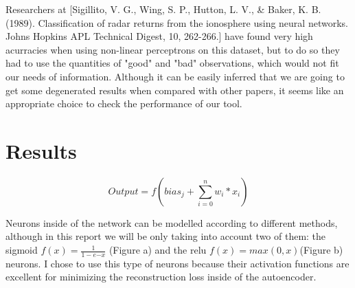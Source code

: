 \documentclass[12pt]{report}
\begin{document}
Researchers at [Sigillito, V. G., Wing, S. P., Hutton, L. V., \& Baker, K. B. (1989). Classification of radar returns from the ionosphere using neural networks. Johns Hopkins APL Technical Digest, 10, 262-266.] have found very high acurracies when using non-linear perceptrons on this dataset, but to do so they had to use the quantities of "good" and "bad" observations, which would not fit our needs of information. Although it can be easily inferred that we are going to get some degenerated results when compared with other papers, it seems like an appropriate choice to check the performance of our tool. \par 

\chapter{Results}


\begin{equation}
\label{eq:artificial neuron}
Output = f( bias_j + \sum_{i = 0}^{n} w_{i}*x_i ) 
\end{equation}
\newline

Neurons inside of the network can be modelled according to different methods, although in this report we will be only taking into account two of them: the sigmoid $f(x) = \frac{1}{1 - e{-x}}$ (Figure a) and the relu $f(x) = max(0,x)$(Figure b) neurons. I chose to use this type of neurons because their activation functions are excellent for minimizing the reconstruction loss inside of the autoencoder. \newline
\end{document}
